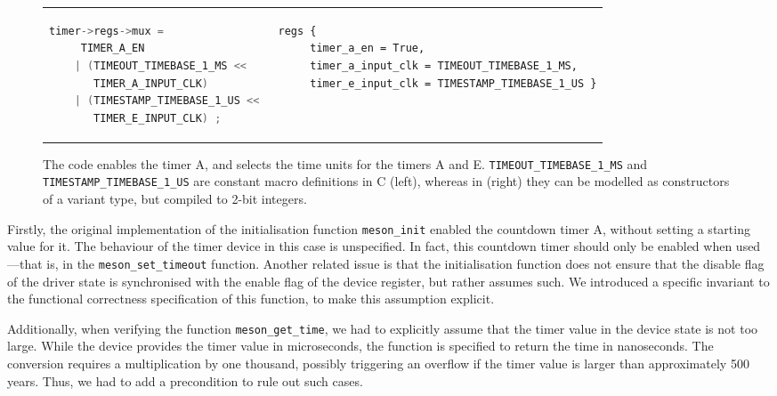 \begin{figure}
\begin{tabular}{p{}p{}}
\begin{minipage}{.5\textwidth}
\begin{lstlisting}[language=C]
  timer->regs->mux =
     TIMER_A_EN 
    | (TIMEOUT_TIMEBASE_1_MS << 
       TIMER_A_INPUT_CLK)
    | (TIMESTAMP_TIMEBASE_1_US << 
       TIMER_E_INPUT_CLK) ;
\end{lstlisting}
\end{minipage} &
\begin{minipage}{.5\textwidth}
\begin{lstlisting}[language=Cogent]
  regs {
     timer_a_en = True,
     timer_a_input_clk = TIMEOUT_TIMEBASE_1_MS,
     timer_e_input_clk = TIMESTAMP_TIMEBASE_1_US }
\end{lstlisting}
\end{minipage}
\end{tabular}
  \caption{The code 
  enables the timer A, and selects
  the time units for the timers A and E.
  \texttt{TIMEOUT\_TIMEBASE\_1\_MS} and
  \texttt{TIMESTAMP\_TIMEBASE\_1\_US} are constant macro definitions in C (left), whereas in \cogent (right)
  they can be modelled as constructors of a variant type, but compiled to 2-bit integers.}
\label{fig:timer-set}
\end{figure}

Firstly, the original implementation of the initialisation function \lstinline{meson_init}
enabled the countdown timer A, without setting a starting value for it. The behaviour of the timer
device in this case is unspecified. In fact, this countdown timer should 
only be enabled when used---that is, in the \lstinline{meson_set_timeout} function.
Another related issue is that the initialisation function does not ensure that
the disable flag of the driver state is synchronised with the enable flag of the
device register, but rather assumes such. We introduced a specific invariant to the functional correctness specification of this function, to make this assumption explicit.

Additionally, when verifying the function
 \lstinline{meson_get_time}, we had to explicitly assume that the timer value in the device state is not too large. While the device provides the timer value in microseconds, the function is specified to return the time in nanoseconds.
The conversion requires a multiplication by one thousand, possibly triggering
an overflow if the timer value is larger than approximately 500 years. Thus, we had to add a precondition to rule out such cases.

